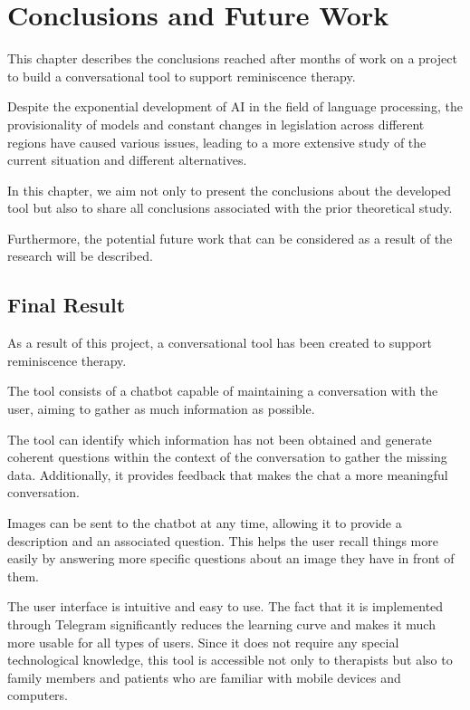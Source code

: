 \chapter*{Conclusions and Future Work}
\label{chap:conclusions}
This chapter describes the conclusions reached after months of work on a project to build a conversational tool to support reminiscence therapy.

Despite the exponential development of AI in the field of language processing, the provisionality of models and constant changes in legislation across different regions have caused various issues, leading to a more extensive study of the current situation and different alternatives.

In this chapter, we aim not only to present the conclusions about the developed tool but also to share all conclusions associated with the prior theoretical study.

Furthermore, the potential future work that can be considered as a result of the research will be described.

\section{Final Result}
As a result of this project, a conversational tool has been created to support reminiscence therapy.

The tool consists of a chatbot capable of maintaining a conversation with the user, aiming to gather as much information as possible.

The tool can identify which information has not been obtained and generate coherent questions within the context of the conversation to gather the missing data. Additionally, it provides feedback that makes the chat a more meaningful conversation.

Images can be sent to the chatbot at any time, allowing it to provide a description and an associated question. This helps the user recall things more easily by answering more specific questions about an image they have in front of them.

The user interface is intuitive and easy to use. The fact that it is implemented through Telegram significantly reduces the learning curve and makes it much more usable for all types of users. Since it does not require any special technological knowledge, this tool is accessible not only to therapists but also to family members and patients who are familiar with mobile devices and computers.

